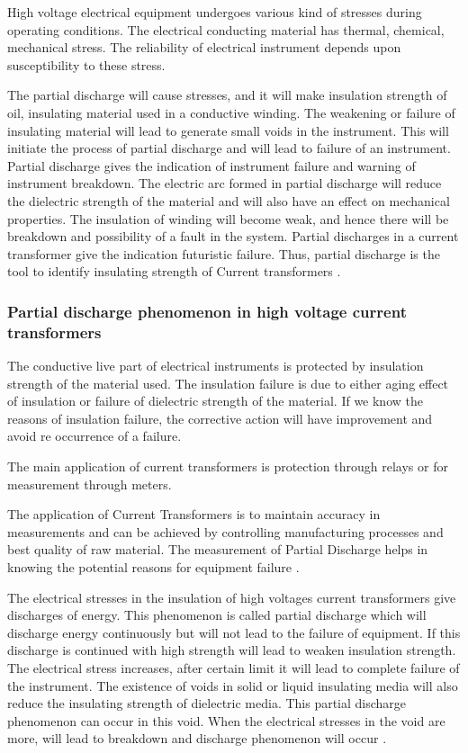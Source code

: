 High voltage electrical equipment undergoes various kind of stresses during operating conditions. The electrical conducting material has thermal, chemical, mechanical stress. The reliability of electrical instrument depends upon susceptibility to these stress.

The partial discharge will cause stresses, and it will make insulation strength of oil, insulating material used in a conductive winding. The weakening or failure of insulating material will lead to generate small voids in the instrument. This will initiate the process of partial discharge and will lead to failure of an instrument. Partial discharge gives the indication of instrument failure and warning of instrument breakdown. The electric arc formed in partial discharge will reduce the dielectric strength of the material and will also have an effect on mechanical properties. The insulation of winding will become weak, and hence there will be breakdown and possibility of a fault in the system. Partial discharges in a current transformer give the indication futuristic failure. Thus, partial discharge is the tool to identify insulating strength of Current transformers \setlength{\parskip}{0em} \cite{kolev1998partial}.

\subsubsection{Partial discharge phenomenon in high voltage current transformers}
The conductive live part of electrical instruments is protected by insulation strength of the material used. The insulation failure is due to either aging effect of insulation or failure of dielectric strength of the material. If we know the reasons of insulation failure, the corrective action will have improvement and avoid re occurrence of a failure.\setlength{\parskip}{1em}

The main application of current transformers is protection through relays or for measurement through meters.

The application of Current Transformers is to maintain accuracy in measurements and can be achieved by controlling manufacturing processes and best quality of raw material. The measurement of Partial Discharge helps in knowing the potential reasons for equipment failure \cite{ren2006simulation}.

The electrical stresses in the insulation of high voltages current transformers give discharges of energy. This phenomenon is called partial discharge which will discharge energy continuously but will not lead to the failure of equipment. If this discharge is continued with high strength will lead to weaken insulation strength. The electrical stress increases, after certain limit it will lead to complete failure of the instrument. The existence of voids in solid or liquid insulating media will also reduce the insulating strength of dielectric media. This partial discharge phenomenon can occur in this void. When the electrical stresses in the void are more, will lead to breakdown and discharge phenomenon will occur \cite{kolev1999approach}.

